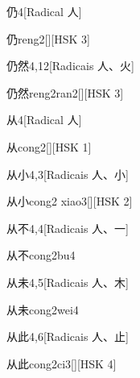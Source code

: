 \begin{entry}{仍}{4}[Radical ⼈]
  \begin{phonetics}{仍}{reng2}[][HSK 3]
  \end{phonetics}
\end{entry}

\begin{entry}{仍然}{4,12}[Radicais ⼈、⽕]
  \begin{phonetics}{仍然}{reng2ran2}[][HSK 3]
  \end{phonetics}
\end{entry}

\begin{entry}{从}{4}[Radical ⼈]
  \begin{phonetics}{从}{cong2}[][HSK 1]
  \end{phonetics}
\end{entry}

\begin{entry}{从小}{4,3}[Radicais ⼈、⼩]
  \begin{phonetics}{从小}{cong2 xiao3}[][HSK 2]
  \end{phonetics}
\end{entry}

\begin{entry}{从不}{4,4}[Radicais ⼈、⼀]
  \begin{phonetics}{从不}{cong2bu4}
  \end{phonetics}
\end{entry}

\begin{entry}{从未}{4,5}[Radicais ⼈、⽊]
  \begin{phonetics}{从未}{cong2wei4}
  \end{phonetics}
\end{entry}

\begin{entry}{从此}{4,6}[Radicais ⼈、⽌]
  \begin{phonetics}{从此}{cong2ci3}[][HSK 4]
  \end{phonetics}
\end{entry}

